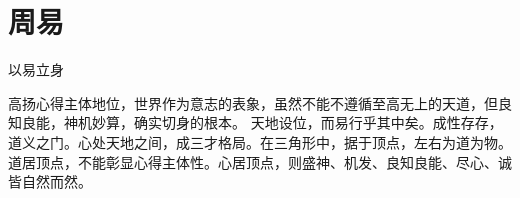 \chapter{周易}

以易立身

高扬心得主体地位，世界作为意志的表象，虽然不能不遵循至高无上的天道，但良知良能，神机妙算，确实切身的根本。
天地设位，而易行乎其中矣。成性存存，道义之门。心处天地之间，成三才格局。在三角形中，据于顶点，左右为道为物。
道居顶点，不能彰显心得主体性。心居顶点，则盛神、机发、良知良能、尽心、诚皆自然而然。



